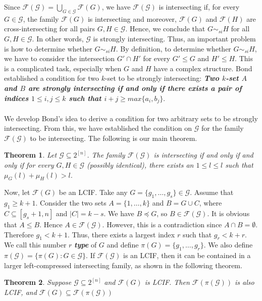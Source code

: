 \documentclass[reqno,english]{amsart}
\theoremstyle{plain}
\newtheorem{theorem}{Theorem}[section]
\theoremstyle{remark}
\newcommand{\0}[0]{\emptyset}
\renewcommand{\1}[0]{\textbf{1}}
\theoremstyle{plain}
\theoremstyle{remark}
\renewcommand{\1}[0]{\textbf{1}}
\begin{document}
Since $\mathcal{F}(\mathcal{G})=\bigcup_{G \in \mathcal{G}}\mathcal{F}(G)$, we have $\mathcal{F}(\mathcal{G})$ is intersecting if, for every $G \in \mathcal{G}$, the family $\mathcal{F}(G)$ is intersecting and moreover, $\mathcal{F}(G)$ and $\mathcal{F}(H)$ are cross-intersecting for all pairs $G, H \in \mathcal{G}$. Hence, we conclude that $G \sim_{si} H $ for all $G,H \in \mathcal{G}$. In other words, $\mathcal{G}$ is strongly intersecting. Thus, an important problem is how to determine whether $G \sim_{si} H$. By definition, to determine whether $G \sim_{si} H$, we have to consider the intersection $G' \cap H'$ for every $G' \leq G$ and $H' \leq H$. This is a complicated task, especially when $G$ and $H$ have a complex structure. Bond \cite{BB} established a condition for two $k$-set to be strongly intersecting: {\bf \emph{Two $k$-set $A$ and $B$ are strongly intersecting if and only if there exists a pair of indices $1 \leq i,j \leq k$ such that $i+j \geq max\{a_{i},b_{j}\}$}}.\\ \\
We develop Bond’s idea to derive a condition for two arbitrary sets to be strongly intersecting. From this, we have established the condition on $\mathcal{G}$  for the family $\mathcal{F}(\mathcal{G})$ to be intersecting. The following is our main theorem. 
\begin{theorem}\label{thr} Let $\mathcal{G} \subseteq  2^{[n]}$. The family $\mathcal{F}(\mathcal{G})$ is intersecting if and only if and only if for every $G, H \in \mathcal{G}$ (possibly identical), there exists an $1 \le l \le l$ such that $\mu_{G}(l) + \mu_{H}(l) > l$. 
\end{theorem}
Now, let $\mathcal{F}(G)$ be an LCIF. Take any $G=\{g_{1},\ldots,g_{s}\} \in \mathcal{G}$. Assume that $g_{1} \geq k+1$. Consider the two sets $A=\{1,\ldots,k\}$ and $B=G \cup C$, where $C \subseteq [g_{s}+1,n]$ and $|C|=k-s$. We have $B \preceq G$, so $B \in \mathcal{F}(\mathcal{G})$. It is obvious that $A \leq B$. Hence $A \in \mathcal{F}(\mathcal{G})$. However, this is a contradiction since $A \cap B=\emptyset$. Therefore $g_{1} < k+1$. Thus, there exists a largest index $r$ such that $g_{r} < k+r$. We call this number $r$ {\bf \emph{ type}} of $G$ and define $\pi(G)=\{g_{1},\ldots,g_{r}\}$. We also define $\pi(\mathcal{G})=\{\pi(G): G \in \mathcal{G}\}$.
If $\mathcal{F}(\mathcal{G})$ is an LCIF, then it can be contained in a larger left-compressed intersecting family, as shown in the following theorem.
\begin{theorem} Suppose $\mathcal{G} \subseteq 2^{[n]}$ and $\mathcal{F}(G)$ is LCIF. Then $\mathcal{F}(\pi(\mathcal{G}))$ is also LCIF, and $\mathcal{F}(G) \subseteq \mathcal{F}(\pi(\mathcal{G})) $
\end{theorem}
\end{document}
